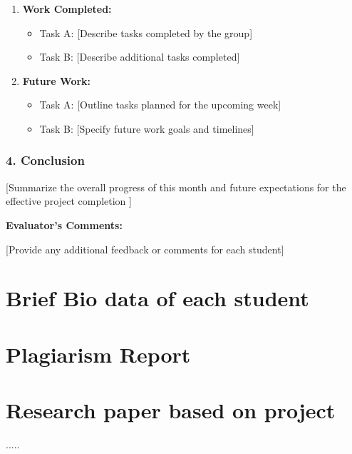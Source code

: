 \begin{enumerate}
	\item \textbf{Work Completed:}
	\begin{itemize}
		\item Task A: [Describe tasks completed by the group]
		\item Task B: [Describe additional tasks completed]
	\end{itemize}
	
	\item \textbf{Future Work:}
	\begin{itemize}
		\item Task A: [Outline tasks planned for the upcoming week]
		\item Task B: [Specify future work goals and timelines]
	\end{itemize}
\end{enumerate}

\subsection*{4. Conclusion}

[Summarize the overall progress of this month  and future expectations for the effective project completion ]

\vspace{1cm}

\textbf{Evaluator's Comments:}

[Provide any additional feedback or comments for each student]


\chapter{Brief Bio data of each student}


\chapter{Plagiarism Report}


\chapter{Research paper based on project}
.....